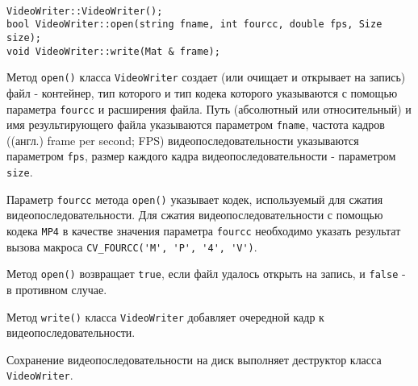 \begin{lstlisting}

VideoWriter::VideoWriter();
bool VideoWriter::open(string fname, int fourcc, double fps, Size size);
void VideoWriter::write(Mat & frame);

\end{lstlisting}
\mylistingend

Метод \verb|open()| класса \verb|VideoWriter| создает (или очищает и открывает на запись) файл - контейнер, тип которого и тип кодека которого указываются с помощью параметра \verb|fourcc| и расширения файла. Путь (абсолютный или относительный) и имя результирующего файла указываются параметром \verb|fname|, частота кадров ((англ.) frame per second; FPS) видеопоследовательности указываются параметром \verb|fps|, размер каждого кадра видеопоследовательности - параметром \verb|size|.

Параметр \verb|fourcc| метода \verb|open()| указывает кодек, используемый для сжатия видеопоследовательности. Для сжатия видеопоследовательности с помощью кодека \verb|MP4| в качестве значения параметра \verb|fourcc| необходимо указать результат вызова макроса \linebreak \verb|CV_FOURCC('M', 'P', '4', 'V')|.

Метод \verb|open()| возвращает \verb|true|, если файл удалось открыть на запись, и \verb|false| - в противном случае.

Метод \verb|write()| класса \verb|VideoWriter| добавляет очередной кадр к видеопоследовательности.

Сохранение видеопоследовательности на диск выполняет деструктор класса \verb|VideoWriter|.

